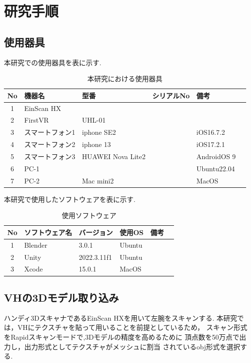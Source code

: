 \documentclass{ltjsreport}
\begin{document}
\chapter{研究手順}
	\section{使用器具}
		本研究での使用器具を表に示す.
	\begin{table}[H]
	\begin{center}
	\caption{本研究における使用器具}
	\label{tab:usedev}
	\begin{tabular}{clllll} \toprule
	No&\multicolumn{1}{l}{機器名}&\multicolumn{1}{l}{型番}&\multicolumn{1}{l}{シリアルNo}&\multicolumn{1}{l}{備考}\\ \hline
	1&EinScan HX&&&\\
	2&FirstVR&UHL-01&&\\
	3&スマートフォン1&iphone SE2&&iOS16.7.2\\
	4&スマートフォン2&iphone 13&&iOS17.2.1\\
	5&スマートフォン3&HUAWEI Nova Lite2&&AndroidOS 9\\
	6&PC-1&&&Ubuntu22.04\\
	7&PC-2&Mac mini2&&MacOS\\
	\bottomrule
	\end{tabular}
	\end{center}
	\end{table}
	本研究で使用したソフトウェアを表に示す.
	\begin{table}[H]
	\begin{center}
	\caption{使用ソフトウェア}
	\label{tab:usesoft}
	\begin{tabular}{clllll} \toprule
	No&\multicolumn{1}{l}{ソフトウェア名}&\multicolumn{1}{l}{バージョン}&\multicolumn{1}{l}{使用OS}&\multicolumn{1}{l}{備考}\\ \hline
	1&Blender&3.0.1&Ubuntu&\\
	2&Unity&2022.3.11f1&Ubuntu&\\
	3&Xcode&15.0.1&MacOS&\\
	\bottomrule
	\end{tabular}
	\end{center}
	\end{table}
	\section{VHの3Dモデル取り込み}
		ハンディ3DスキャナであるEinScan HXを用いて左腕をスキャンする.
		本研究では，VHにテクスチャを貼って用いることを前提としているため，
		スキャン形式をRapidスキャンモードで,3Dモデルの精度を高めるために
		頂点数を50万点で出力し，出力形式としてテクスチャがメッシュに割当
		されているobj形式を選択する.
\end{document}
